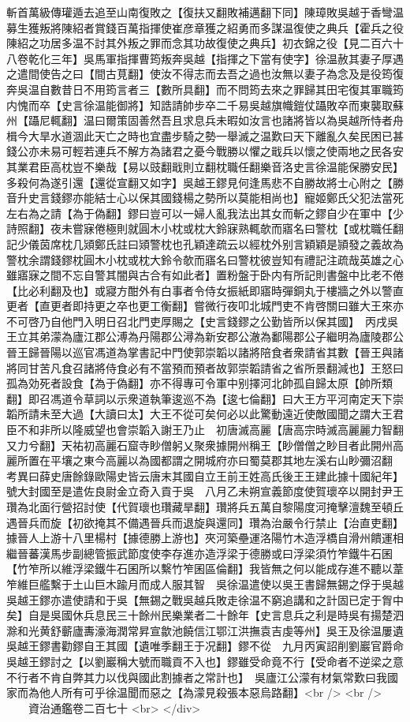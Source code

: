 斬首萬級傳瓘遁去追至山南復敗之【復扶又翻敗補邁翻下同】陳璋敗吳越于香彎温募生獲叛將陳紹者賞錢百萬指揮使崔彦章獲之紹勇而多謀温復使之典兵【霍兵之役陳紹之功居多温不討其外叛之罪而念其功故復使之典兵】初衣錦之役【見二百六十八卷乾化三年】吳馬軍指揮曹筠叛奔吳越【指揮之下當有使字】徐温赦其妻子厚遇之遣間使告之曰【間古莧翻】使汝不得志而去吾之過也汝無以妻子為念及是役筠復奔吳温自數昔日不用筠言者三【數所具翻】而不問筠去來之罪歸其田宅復其軍職筠内愧而卒【史言徐温能御將】知誥請帥步卒二千易吳越旗幟鎧仗躡敗卒而東襲取蘇州【躡尼輒翻】温曰爾策固善然吾且求息兵未暇如汝言也諸將皆以為吳越所恃者舟楫今大旱水道涸此天亡之時也宜盡步騎之勢一舉滅之温歎曰天下離亂久矣民困已甚錢公亦未易可輕若連兵不解方為諸君之憂今戰勝以懼之戢兵以懷之使兩地之民各安其業君臣高枕豈不樂哉【易以豉翻戢則立翻枕職任翻樂音洛史言徐温能保勝安民】多殺何為遂引還【還從宣翻又如字】吳越王鏐見何逢馬悲不自勝故將士心附之【勝音升史言錢鏐亦能結士心以保其國錢楊之勢所以莫能相尚也】寵姬鄭氏父犯法當死左右為之請【為于偽翻】鏐曰豈可以一婦人亂我法出其女而斬之鏐自少在軍中【少詩照翻】夜未嘗寐倦極則就圓木小枕或枕大鈴寐熟輒欹而寤名曰警枕【或枕職任翻記少儀茵席枕几熲鄭氏註曰熲警枕也孔穎達疏云以經枕外别言穎穎是頴發之義故為警枕余謂錢鏐枕圓木小枕或枕大鈴令欹而寤名曰警枕彼豈知有禮記注疏哉英雄之心雖寤寐之間不忘自警其闇與古合有如此者】置粉盤于卧内有所記則書盤中比老不倦【比必利翻及也】或寢方酣外有白事者令侍女振紙即寤時彈銅丸于樓牆之外以警直更者【直更者即持更之卒也更工衡翻】嘗微行夜叩北城門吏不肯啓關曰雖大王來亦不可啓乃自他門入明日召北門吏厚賜之【史言錢鏐之公勤皆所以保其國】　丙戌吳王立其弟濛為廬江郡公溥為丹陽郡公潯為新安郡公澈為鄱陽郡公子繼明為廬陵郡公　晉王歸晉陽以巡官馮道為掌書記中門使郭崇韜以諸將陪食者衆請省其數【晉王與諸將同甘苦凡食召諸將侍食必有不當預而預者故郭崇韜請省之省所景翻減也】王怒曰孤為効死者設食【為于偽翻】亦不得專可令軍中别擇河北帥孤自歸太原【帥所類翻】即召馮道令草詞以示衆道執筆逡巡不為【逡七倫翻】曰大王方平河南定天下崇韜所請未至大過【大讀曰太】大王不從可矣何必以此驚動遠近使敵國聞之謂大王君臣不和非所以隆威望也會崇韜入謝王乃止　初唐滅高麗【唐高宗時滅高麗麗力智翻又力兮翻】天祐初高麗石窟寺眇僧躬乂聚衆據開州稱王【眇僧僧之眇目者此開州高麗所置在平壤之東今高麗以為國都謂之開城府亦曰蜀莫郡其地左溪右山眇彌沼翻　考異曰薛史唐餘錄歐陽史皆云唐末其國自立王前王姓高氏後王王建此據十國紀年】號大封國至是遣佐良尉金立奇入貢于吳　八月乙未朔宣義節度使賀瓌卒以開封尹王瓚為北面行營招討使【代賀瓌也瓚藏旱翻】瓚將兵五萬自黎陽度河掩擊澶魏至頓丘遇晉兵而旋【初欲掩其不備遇晉兵而退旋與還同】瓚為治嚴令行禁止【治直吏翻】據晉人上游十八里楊村【據德勝上游也】夾河築壘運洛陽竹木造浮橋自滑州饋運相繼晉蕃漢馬步副總管振武節度使李存進亦造浮梁于德勝或曰浮梁須竹笮鐵牛石囷【竹笮所以維浮梁鐵牛石囷所以繫竹笮囷區倫翻】我皆無之何以能成存進不聽以葦笮維巨艦繫于土山巨木踰月而成人服其智　吳徐温遣使以吳王書歸無錫之俘于吳越吳越王鏐亦遣使請和于吳【無錫之戰吳越兵敗走徐温不窮追講和之計固已定于胷中矣】自是吳國休兵息民三十餘州民樂業者二十餘年【史言息兵之利是時吳有揚楚泗滁和光黄舒蘄廬夀濠海潤常昇宣歙池饒信江鄂江洪撫袁吉虔等州】吳王及徐温屢遺吳越王鏐書勸鏐自王其國【遺唯季翻王于况翻】鏐不從　九月丙寅詔削劉巖官爵命吳越王鏐討之【以劉巖稱大號而職貢不入也】鏐雖受命竟不行【受命者不逆梁之意不行者不肯自弊其力以伐與國此割據者之常計也】　吳廬江公濛有材氣常歎曰我國家而為他人所有可乎徐温聞而惡之【為濛見殺張本惡烏路翻】<br />
<br />
　　資治通鑑卷二百七十  <br>
   </div> 

